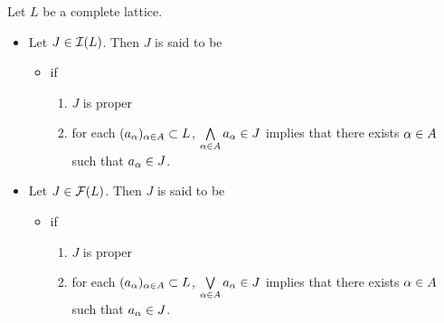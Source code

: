 \documentclass{book}
\begin{document}
	\begin{defn}
		Let $L$ be a complete lattice. 
		\begin{itemize}
			\item Let $J \in \mathcal{I}(L)$. Then $J$ is said to be
			\begin{itemize}
				\item {} if
				\begin{enumerate}
					\item $J$ is proper
					\item for each $(a_{\alpha})_{\alpha \in A} \subset L$, $\bigwedge\limits_{\alpha \in A} a_{\alpha} \in J$ implies that there exists $\alpha \in A$ such that $a_{\alpha} \in J$.
				\end{enumerate}
			\end{itemize} 
			\item Let $J \in \mathcal{F}(L)$. Then $J$ is said to be 
			\begin{itemize}
				\item {} if 
				\begin{enumerate}
					\item $J$ is proper
					\item for each $(a_{\alpha})_{\alpha \in A} \subset L$, $\bigvee\limits_{\alpha \in A} a_{\alpha} \in J$ implies that there exists $\alpha \in A$ such that $a_{\alpha} \in J$.
				\end{enumerate}
			\end{itemize} 
		\end{itemize}
	\end{defn}
	
	
	
	
	
	
	
	
	
	
	
	
	
	
	
	
	
	
	
	
	
	
	
	
	
	
	
	
	
	
	
	
	
	
	
	
	
	
	
	
	
	
	
	
	
\end{document}
